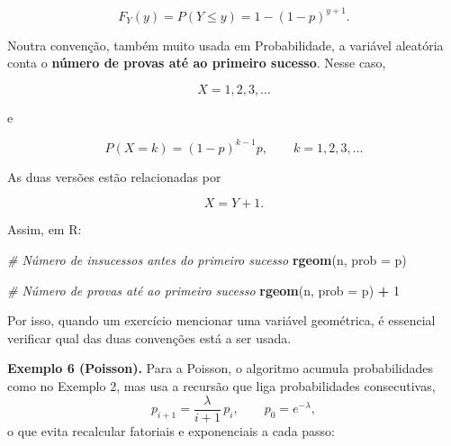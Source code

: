 \documentclass[
  portuguese,
  11pt,
  openany]{book}
\newenvironment{Shaded}{\begin{snugshade}}{\end{snugshade}}
\newcommand{\AttributeTok}[1]{\textcolor[rgb]{0.13,0.29,0.53}{#1}}
\newcommand{\CommentTok}[1]{\textcolor[rgb]{0.56,0.35,0.01}{\textit{#1}}}
\newcommand{\DecValTok}[1]{\textcolor[rgb]{0.00,0.00,0.81}{#1}}
\newcommand{\FunctionTok}[1]{\textcolor[rgb]{0.13,0.29,0.53}{\textbf{#1}}}
\newcommand{\NormalTok}[1]{#1}
\newcommand{\SpecialCharTok}[1]{\textcolor[rgb]{0.81,0.36,0.00}{\textbf{#1}}}
\begin{document}
\[
F_Y(y)=P(Y\leq y)=1-(1-p)^{y+1}.
\]

Noutra convenção, também muito usada em Probabilidade, a variável aleatória conta o
\textbf{número de provas até ao primeiro sucesso}. Nesse caso,

\[
X=1,2,3,\ldots
\]

e

\[
P(X=k)=(1-p)^{k-1}p, \qquad k=1,2,3,\ldots
\]

As duas versões estão relacionadas por

\[
X = Y+1.
\]

Assim, em R:

\begin{Shaded}
\begin{Highlighting}[]
\CommentTok{\# Número de insucessos antes do primeiro sucesso}
\FunctionTok{rgeom}\NormalTok{(n, }\AttributeTok{prob =}\NormalTok{ p)}

\CommentTok{\# Número de provas até ao primeiro sucesso}
\FunctionTok{rgeom}\NormalTok{(n, }\AttributeTok{prob =}\NormalTok{ p) }\SpecialCharTok{+} \DecValTok{1}
\end{Highlighting}
\end{Shaded}

Por isso, quando um exercício mencionar uma variável geométrica, é essencial verificar
qual das duas convenções está a ser usada.

\textbf{Exemplo 6 (Poisson).} Para a Poisson, o algoritmo acumula probabilidades como no
Exemplo 2, mas usa a recursão que liga probabilidades consecutivas,
\[p_{i+1} = \frac{\lambda}{i + 1}\, p_i, \qquad p_0 = e^{-\lambda},\]
o que evita recalcular fatoriais e exponenciais a cada passo:
\end{document}
